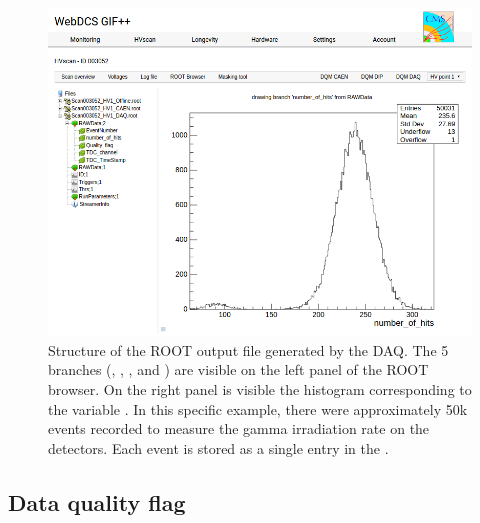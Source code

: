     \begin{figure}[H]
		\centering
		\includegraphics[width = \plotwidth]{fig/app1/webDCS-ROOT-browser.png}
		\caption{\label{fig:ROOTfile} Structure of the ROOT output file generated by the DAQ. The 5 branches (, , ,  and ) are visible on the left panel of the ROOT browser. On the right panel is visible the histogram corresponding to the variable . In this specific example, there were approximately 50k events recorded to measure the gamma irradiation rate on the detectors. Each event is stored as a single entry in the .}
	\end{figure}
	
	\subsection{Data quality flag}
	\label{app1:ssec:QFlag}
	

